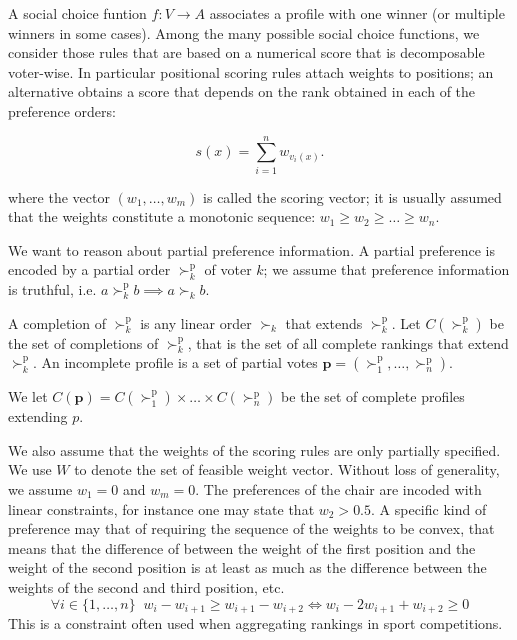 \documentclass[12pt]{article}
\newcommand{\pref}{{\succ}}%
\newcommand{\ppref}{\succ^\text{p}}%
\begin{document}
A social choice funtion $f : V \rightarrow A$ associates a profile with one winner (or multiple winners in some cases).
Among the many possible social choice functions, we consider those rules that are based on a numerical score that is decomposable voter-wise.
In particular positional scoring rules attach weights to positions;
an alternative obtains a score that depends on the rank obtained in each of the preference orders:

\[ s(x) = \sum_{i=1}^{n} w_{v_i(x)}. \]

where the vector $(w_1,\ldots,w_m)$ is called the scoring vector;
 it is usually assumed that the weights constitute a monotonic sequence: $w_{1} \geq w_{2} \geq \ldots \geq w_{n}$.

\medskip
We want to reason about partial preference information.
A partial preference  is encoded by a partial order $\ppref_k$  of voter $k$;
we assume that preference information is truthful, i.e. $a \ppref_k b \implies a \pref_k b$.

A completion of $\ppref_k$ is any linear order $\pref_k$ that extends $\ppref_k$.
Let $C(\ppref_k)$ be the set of completions of $\ppref_k$, that is the set of all complete rankings that extend $\ppref_k$.
An incomplete profile is a set of partial votes %
$\textbf{p}=(\ppref_1,\ldots,\ppref_n)$.

We let $C(\textbf{p})=C(\ppref_1)\times \ldots \times C(\ppref_n)$ be the set of complete profiles extending $p$.

\medskip
We also assume that the weights of the scoring rules are only partially specified.
We use $W$ to denote the set of feasible weight vector.
Without loss of generality, we assume $w_1=0$ and $w_m=0$.
The preferences of the chair are incoded with linear constraints, for instance one may state
that $w_2>0.5$.
A specific kind of preference may that of requiring the sequence of the weights to be convex, that means
that the difference of between the weight of the first position and the weight of the second position is at least as much as the difference between the weights of the second and third position, etc. 
\[ \forall i \in \{1,\ldots,n\} \;\; w_i - w_{i+1} \geq w_{i+1}-w_{i+2} \iff  w_i - 2 w_{i+1} + w_{i+2} \geq 0 \]
This is a constraint often used when aggregating rankings in sport competitions.
\end{document}
